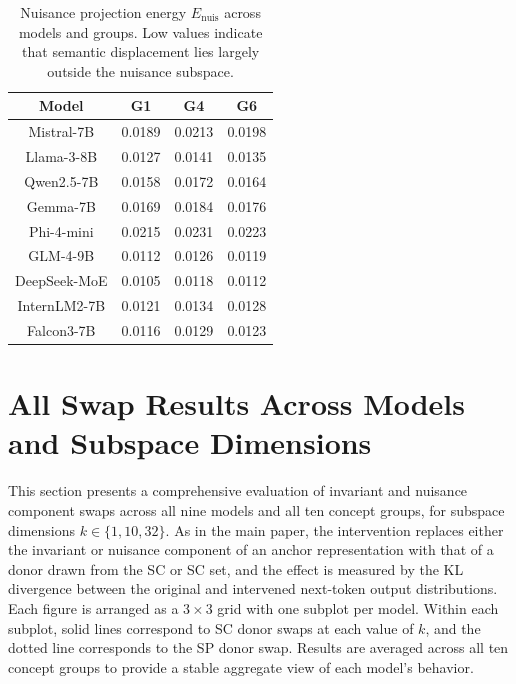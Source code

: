 \begin{table}
\vspace{-1.25em}
\centering
\scriptsize
\setlength{\tabcolsep}{4pt}
\renewcommand{\arraystretch}{1.2}
\begin{tabular}{c|ccc}
\hline
Model 
& G1 
& G4 
& G6 \\
\hline

Mistral-7B 
& 0.0189 & 0.0213 & 0.0198 \\

Llama-3-8B 
& 0.0127 & 0.0141 & 0.0135 \\

Qwen2.5-7B
& 0.0158 & 0.0172 & 0.0164 \\

Gemma-7B
& 0.0169 & 0.0184 & 0.0176 \\

Phi-4-mini
& 0.0215 & 0.0231 & 0.0223 \\

GLM-4-9B
& 0.0112 & 0.0126 & 0.0119 \\

DeepSeek-MoE
& 0.0105 & 0.0118 & 0.0112 \\

InternLM2-7B
& 0.0121 & 0.0134 & 0.0128 \\

Falcon3-7B
& 0.0116 & 0.0129 & 0.0123 \\

\hline
\end{tabular}
\caption{Nuisance projection energy $E_{\mathrm{nuis}}$ across models and groups. Low values indicate that semantic displacement lies largely outside the nuisance subspace.}
\label{tab:energy}
\vspace{-1.5em}
\end{table}



\section{All Swap Results Across Models and Subspace Dimensions}
\label{app:all_groups}
This section presents a comprehensive evaluation of invariant and nuisance component swaps across all nine models and all ten concept groups, for subspace dimensions $k \in \{1, 10, 32\}$. As in the main paper, the intervention replaces either the invariant or nuisance component of an anchor representation with that of a donor drawn from the SC or SC set, and the effect is measured by the KL divergence between the original and intervened next-token output distributions. Each figure is arranged as a $3\times3$ grid with one subplot per model. Within each subplot, solid lines correspond to SC donor swaps at each value of $k$, and the dotted line corresponds to the SP donor swap. Results are averaged across all ten concept groups to provide a stable aggregate view of each model's behavior.



